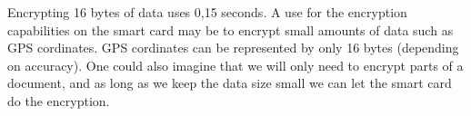 Encrypting 16 bytes of data uses 0,15 seconds. A use for the encryption capabilities on the smart card may be to encrypt small amounts of data such as GPS cordinates. GPS cordinates can be represented by only 16 bytes (depending on accuracy). One could also imagine that we will only need to encrypt parts of a document, and as long as we keep the data size small we can let the smart card do the encryption.
